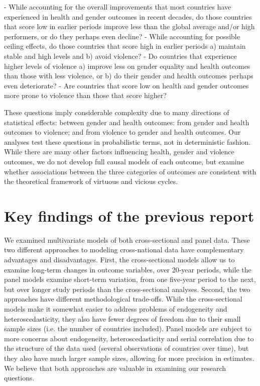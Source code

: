 \documentclass[12pt]{article}
\begin{document}
- While accounting for the overall improvements that most countries have experienced in health and gender outcomes in recent decades, do those countries that score low in earlier periods improve less than the global average and/or high performers, or do they perhaps even decline?
- While accounting for possible ceiling effects, do those countries that score high in earlier periods a) maintain stable and high levels and b) avoid violence?
- Do countries that experience higher levels of violence a) improve less on gender equality and health outcomes than those with less violence, or b) do their gender and health outcomes perhaps even deteriorate?
- Are countries that score low on health and gender outcomes more prone to violence than those that score higher?

These questions imply considerable complexity due to many directions of statistical effects: between gender and health outcomes: from gender and health outcomes to violence; and from violence to gender and health outcomes. Our analyses test these questions in probabilistic terms, not in deterministic fashion. While there are many other factors influencing health, gender and violence outcomes, we do not develop full causal models of each outcome, but examine whether associations between the three categories of outcomes are consistent with the theoretical framework of virtuous and vicious cycles.

\section{Key findings of the previous report}


We examined multivariate models of both cross-sectional and panel data. These two different approaches to modeling cross-national data have complementary advantages and disadvantages.
First, the cross-sectional models allow us to examine long-term changes in outcome variables, over 20-year periods, while the panel models examine short-term variation, from one five-year period to the next, but over longer study periods than the cross-sectional analyses.
Second, the two approaches have different methodological trade-offs. While the cross-sectional models make it somewhat easier to address problems of endogeneity and heteroscedasticity, they also have fewer degrees of freedom due to their small sample sizes (i.e. the number of countries included). Panel models are subject to more concerns about endogeneity, heteroscedasticity and serial correlation due to the structure of the data used (several observations of countries over time), but they also have much larger sample sizes, allowing for more precision in estimates. We believe that both approaches are valuable in examining our research questions.
\end{document}
